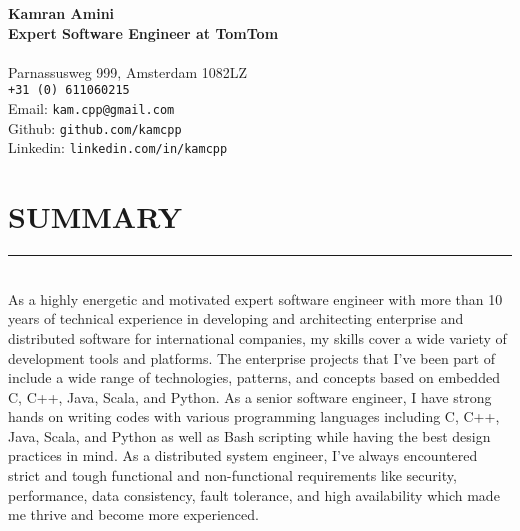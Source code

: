 \documentclass[10pt,a4paper]{article}
\begin{document}
\noindent \textbf{Kamran Amini} \\
\noindent \small \textbf{Expert Software Engineer at TomTom} \\ \\
Parnassusweg 999, Amsterdam 1082LZ \\
\texttt{+31 (0) 611060215} \\
Email: \texttt{kam.cpp@gmail.com} \\
Github: \texttt{github.com/kamcpp} \\
Linkedin: \texttt{linkedin.com/in/kamcpp} 

\section{SUMMARY}
\noindent \rule {18.0cm}{0.2pt} \\
As a highly energetic and motivated expert software engineer with more than 10 years of technical experience in developing and architecting enterprise and distributed software for international companies, my skills cover a wide variety of development tools and platforms. The enterprise projects that I've been part of include a wide range of technologies, patterns, and concepts based on embedded C, C++, Java, Scala, and Python. As a senior software engineer, I have strong hands on writing codes with various programming languages including C, C++, Java, Scala, and Python as well as Bash scripting while having the best design practices in mind. As a distributed system engineer, I've always encountered strict and tough functional and non-functional requirements like security, performance, data consistency, fault tolerance, and high availability which made me thrive and become more experienced.
\end{document}
